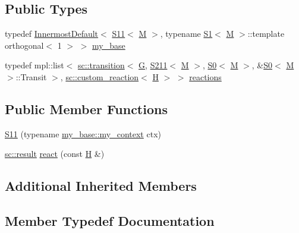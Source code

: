 \subsection*{Public Types}
\begin{DoxyCompactItemize}
\item 
typedef \mbox{\hyperlink{struct_innermost_default}{Innermost\+Default}}$<$ \mbox{\hyperlink{struct_s11}{S11}}$<$ \mbox{\hyperlink{struct_m}{M}} $>$, typename \mbox{\hyperlink{struct_s1}{S1}}$<$ \mbox{\hyperlink{struct_m}{M}} $>$\+::template orthogonal$<$ 1 $>$ $>$ \mbox{\hyperlink{struct_s11_accc75cca39b9a2b76fc048603f4cada2}{my\+\_\+base}}
\item 
typedef mpl\+::list$<$ \mbox{\hyperlink{classboost_1_1statechart_1_1transition}{sc\+::transition}}$<$ \mbox{\hyperlink{struct_g}{G}}, \mbox{\hyperlink{struct_s211}{S211}}$<$ \mbox{\hyperlink{struct_m}{M}} $>$, \mbox{\hyperlink{struct_s0}{S0}}$<$ \mbox{\hyperlink{struct_m}{M}} $>$, \&\mbox{\hyperlink{struct_s0}{S0}}$<$ \mbox{\hyperlink{struct_m}{M}} $>$\+::Transit $>$, \mbox{\hyperlink{classboost_1_1statechart_1_1custom__reaction}{sc\+::custom\+\_\+reaction}}$<$ \mbox{\hyperlink{struct_h}{H}} $>$ $>$ \mbox{\hyperlink{struct_s11_a3aec2b028d4c92398d4056b861050c36}{reactions}}
\end{DoxyCompactItemize}
\subsection*{Public Member Functions}
\begin{DoxyCompactItemize}
\item 
\mbox{\hyperlink{struct_s11_a7059a43ad90c94b21586461983706c21}{S11}} (typename \mbox{\hyperlink{struct_innermost_default_a0aab337364dec3101e80f293b709d53d}{my\+\_\+base\+::my\+\_\+context}} ctx)
\item 
\mbox{\hyperlink{namespaceboost_1_1statechart_abe807f6598b614d6d87bb951ecd92331}{sc\+::result}} \mbox{\hyperlink{struct_s11_a7f4d3c9eb734b105d66f182c768cf324}{react}} (const \mbox{\hyperlink{struct_h}{H}} \&)
\end{DoxyCompactItemize}
\subsection*{Additional Inherited Members}


\subsection{Member Typedef Documentation}
\mbox{\label{struct_s11_accc75cca39b9a2b76fc048603f4cada2}} 
